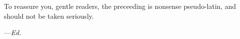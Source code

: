 To reassure you, gentle readers, the preceeding is nonsense pseudo-latin, and should not be taken seriously.

\hfill ---\textit{Ed.}
